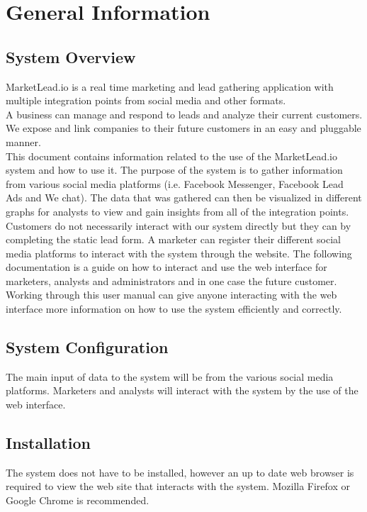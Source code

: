 \documentclass{article}
\begin{document}
	\cleardoublepage
	\tableofcontents
	\cleardoublepage
	
	\section{General Information}
		\subsection{System Overview}
			MarketLead.io is a real time marketing and lead gathering application with multiple integration points from social media and other formats.\\
			A business can manage and respond to leads and analyze their current customers. We expose and link companies to their future customers in an easy and pluggable manner.\\
			This document contains information related to the use of the MarketLead.io system and how to use it. The purpose of the system is to gather information from various social media platforms (i.e. Facebook Messenger, Facebook Lead Ads and We chat).
			The data that was gathered can then be visualized in different graphs for analysts to view and gain insights from all of the integration points. Customers do not necessarily interact with our system directly but they can by completing the static lead form.  %
			A marketer can register their different social media platforms to interact with the system through the website.
			The following documentation is a guide on how to interact and use the web interface for marketers, analysts and administrators and in one case the future customer.
			Working through this user manual can give anyone interacting with the web interface more information on how to use the system efficiently and correctly.

		\subsection{System Configuration}
			The main input of data to the system will be from the various social media platforms.
			Marketers and analysts will interact with the system by the use of the web interface.

		\subsection{Installation}
			The system does not have to be installed, however an up to date web browser is required to view the web site that interacts with the system. Mozilla Firefox or Google Chrome is recommended.
\end{document}
